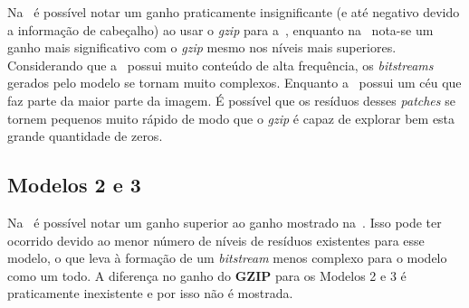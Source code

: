 
Na~ é possível notar um ganho praticamente insignificante (e até negativo devido a informação de cabeçalho) ao usar o \textit{gzip} para a~, enquanto na~ nota-se um ganho mais significativo com o \textit{gzip} mesmo nos níveis mais superiores. Considerando que a~ possui muito conteúdo de alta frequência, os \textit{bitstreams} gerados pelo modelo se tornam muito complexos. Enquanto a~ possui um céu que faz parte da maior parte da imagem. É possível que os resíduos desses \textit{patches} se tornem pequenos muito rápido de modo que o \textit{gzip} é capaz de explorar bem esta grande quantidade de zeros.

\subsection{Modelos 2 e 3}
Na~ é possível notar um ganho superior ao ganho mostrado na~. Isso pode ter ocorrido devido ao menor número de níveis de resíduos existentes para esse modelo, o que leva à formação de um \textit{bitstream} menos complexo para o modelo como um todo. A diferença no ganho do \textbf{GZIP} para os Modelos 2 e 3 é praticamente inexistente e por isso não é mostrada.

